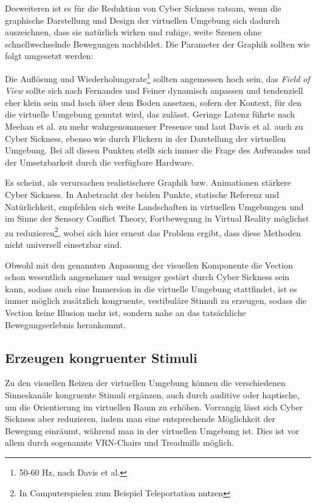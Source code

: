 Desweiteren ist es f\"ur die Reduktion von Cyber Sickness ratsam, wenn die graphische Darstellung und Design der virtuellen Umgebung sich dadurch auszeichnen, dass sie nat\"urlich wirken und ruhige, weite Szenen ohne schnellwechselnde Bewegungen nachbildet. Die Parameter der Graphik sollten wie folgt umgesetzt werden:

Die Aufl\"osung und Wiederholungsrate\footnote{50-60 Hz, nach Davis et al.\cite{Davis:2014:Factors}} sollten angemessen hoch sein\cite{kirollos:2019:refresh}, das \textit{Field of View} sollte sich nach Fernandes und Feiner\cite{Fenandes:2016:FOV} dynamisch anpassen und tendenziell eher klein sein und hoch \"uber dem Boden ansetzen, sofern der Kontext, f\"ur den die virtuelle Umgebung genutzt wird, das zul\"asst. Geringe Latenz f\"uhrte nach Meehan et al.\cite{Meehan:2003:latency} zu mehr wahrgenommener Presence und laut Davis et al.\cite{Davis:2014:Factors} auch zu Cyber Sickness, ebenso wie durch Flickern in der Darstellung der virtuellen Umgebung.
Bei all diesen Punkten stellt sich immer die Frage des Aufwandes und der Umsetzbarkeit durch die verf\"ugbare Hardware.

Es scheint, als verursachen realistischere Graphik bzw. Animationen st\"arkere Cyber Sickness\cite{Pouke:2018:Realism}.
In Anbetracht der beiden Punkte, statische Referenz und Nat\"urlichkeit, empfehlen sich weite Landschaften in virtuellen Umgebungen und im Sinne der Sensory Conflict Theory, Fortbewegung in Virtual Reality m\"oglichst zu reduzieren\footnote{In Computerspielen zum Beispiel Teleportation nutzen}, wobei sich hier erneut das Problem ergibt, dass diese Methoden nicht universell einsetzbar sind.

Obwohl mit den genannten Anpassung der visuellen Komponente die Vection schon wesentlich angenehmer und weniger gest\"ort durch Cyber Sickness sein kann, sodass auch eine Immersion in die virtuelle Umgebung stattfindet, ist es immer m\"oglich zus\"atzlich kongruente, vestibul\"are Stimuli zu erzeugen, sodass die Vection keine Illusion mehr ist, sondern nahe an das tats\"achliche Bewegungserlebnis herankommt.


\subsection{Erzeugen kongruenter Stimuli}\label{Vestibular}

Zu den visuellen Reizen der virtuellen Umgebung k\"onnen die verschiedenen Sinneskan\"ale kongruente Stimuli erg\"anzen, auch durch auditive oder haptische, um die Orientierung im virtuellen Raum zu erh\"ohen. Vorrangig l\"asst sich Cyber Sickness aber reduzieren, indem man eine entsprechende M\"oglichkeit der Bewegung einr\"aumt, w\"ahrend man in der virtuellen Umgebung ist. Dies ist vor allem durch sogenannte VRN-Chairs und Treadmills m\"oglich.

